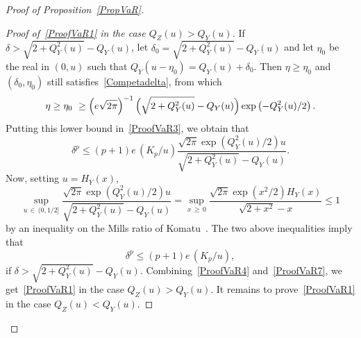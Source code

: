 \documentclass[10pt]{amsart}
\theoremstyle{definition}\newtheorem{defi}[theo]{Definition}\newtheorem{rema}[theo]{Remark}\newtheorem{exam}[theo]{Example}\newtheorem{exem}[theo]{Example}\newtheorem{nota}[theo]{Notation}
\begin{document}
\begin{proof}[{Proof of Proposition~\ref{PropVaR}}]
\begin{proof}[{Proof of~\eqref{ProofVaR1} in the case $Q_Z (u) > Q_Y (u)$}]
If $\delta > \sqrt{2 + Q_Y^2 (u) } - Q_Y (u)$, let $\delta_0 = \sqrt{2 + Q_Y^2 (u) } - Q_Y (u)$ and let $\eta_0$ be the real in $(0,u)$ such that $Q_Y (u-\eta_0) = Q_Y (u) + \delta_0$. Then $\eta \geq \eta_0$ and $(\delta_0, \eta_0)$ still satisfies~\eqref{Competadelta}, from which
\begin{equation}\label{ProofVaR5}
\eta \geq \eta_0 \ \geq\left(e\sqrt{2\pi}\right)^{-1} \Bigl(\sqrt{2 + Q_Y^2 (u) } - Q_Y (u) \Bigr) \exp \left(- Q_Y^2 (u) /2\right).
\end{equation}
Putting this lower bound in~\eqref{ProofVaR3}, we obtain that
\begin{equation}\label{ProofVaR6}
\delta^p \leq (p+1)e \, (K_p/ u) \frac{ \sqrt{2\pi}\exp \left(Q_Y^2 (u) /2\right) u }{ \sqrt{2 + Q_Y^2 (u) } - Q_Y (u) }.
\end{equation}
Now, setting $u= H_Y (x)$,
\[
\sup_{u\,\in\,(0,1/2]} \frac{ \sqrt{2\pi}\exp \left(Q_Y^2 (u) /2\right) u }{ \sqrt{2 + Q_Y^2 (u) } - Q_Y (u) } =
\sup_{x\,\geq\,0} \frac{ \sqrt{2\pi}\exp \left(x^2/2\right) H_Y (x) }{ \sqrt{2 + x^2 } - x } \leq 1
\]
by an inequality on the Mills ratio of Komatu~\cite{Ko55}. The two above inequalities imply that
\begin{equation}\label{ProofVaR7}
\delta^p \leq (p+1)e \, (K_p/ u),
\end{equation}
if $\delta > \sqrt{2 + Q_Y^2 (u)} - Q_Y (u)$. Combining~\eqref{ProofVaR4} and~\eqref{ProofVaR7}, we get~\eqref{ProofVaR1} in the case $Q_Z (u)> Q_Y (u)$. It remains to prove~\eqref{ProofVaR1} in the case $Q_Z (u) < Q_Y (u)$.
\end{proof}



\end{proof}
\end{document}

